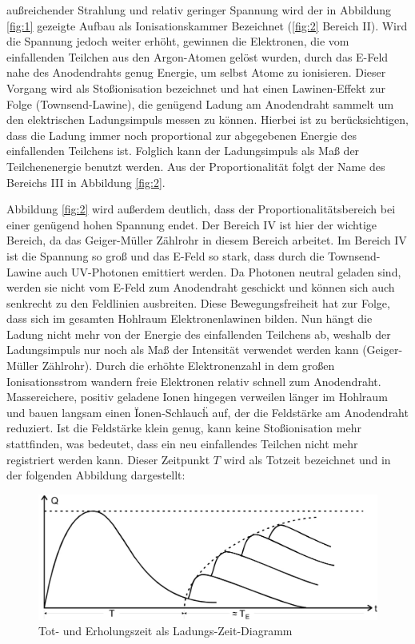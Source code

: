     \justifying außreichender Strahlung und relativ geringer Spannung wird
    der in Abbildung \ref{fig:1} gezeigte Aufbau als Ionisationskammer Bezeichnet (\ref{fig:2}
    Bereich II). Wird die Spannung jedoch weiter erhöht, gewinnen die Elektronen, die vom 
    einfallenden Teilchen aus den Argon-Atomen gelöst wurden, durch das E-Feld nahe des 
    Anodendrahts genug Energie, um selbst Atome zu ionisieren. Dieser Vorgang wird als 
    Stoßionisation bezeichnet und hat einen Lawinen-Effekt zur Folge (Townsend-Lawine), die
    genügend Ladung am Anodendraht sammelt um den elektrischen Ladungsimpuls messen zu können. Hierbei
    ist zu berücksichtigen, dass die Ladung immer noch proportional zur abgegebenen Energie des
    einfallenden Teilchens ist. Folglich kann der Ladungsimpuls als Maß der Teilchenenergie benutzt
    werden. Aus der Proportionalität folgt der Name des Bereichs III in Abbildung \ref{fig:2}.

    \justifying Abbildung \ref{fig:2} wird außerdem deutlich, dass der 
    Proportionalitätsbereich bei einer genügend hohen Spannung endet. Der Bereich IV ist hier
    der wichtige Bereich, da das Geiger-Müller Zählrohr in diesem Bereich arbeitet. Im Bereich
    IV ist die Spannung so groß und das E-Feld so stark, dass durch die Townsend-Lawine auch 
    UV-Photonen emittiert werden. Da Photonen neutral geladen sind, werden sie nicht vom E-Feld
    zum Anodendraht geschickt und können sich auch senkrecht zu den Feldlinien ausbreiten. Diese 
    Bewegungsfreiheit hat zur Folge, dass sich im gesamten Hohlraum Elektronenlawinen bilden. 
    Nun hängt die Ladung nicht mehr von der Energie des einfallenden Teilchens ab, weshalb der
    Ladungsimpuls nur noch als Maß der Intensität verwendet werden kann (Geiger-Müller Zählrohr).
    Durch die erhöhte Elektronenzahl in dem großen Ionisationsstrom wandern freie Elektronen 
    relativ schnell zum Anodendraht. Massereichere, positiv geladene Ionen hingegen verweilen
    länger im Hohlraum und bauen langsam einen \"Ionen-Schlauch\"\; auf, der die Feldstärke am 
    Anodendraht reduziert. Ist die Feldstärke klein genug, kann keine Stoßionisation mehr
    stattfinden, was bedeutet, dass ein neu einfallendes Teilchen nicht mehr registriert werden
    kann. Dieser Zeitpunkt $T$ wird als Totzeit bezeichnet und in der folgenden Abbildung dargestellt:

    \begin{figure}[H]
        \centering
        \includegraphics[width=\linewidth]{images/Erholungszeit.jpg}
        \caption{Tot- und Erholungszeit als Ladungs-Zeit-Diagramm \cite{V703}}
        \label{fig:3}
    \end{figure}

